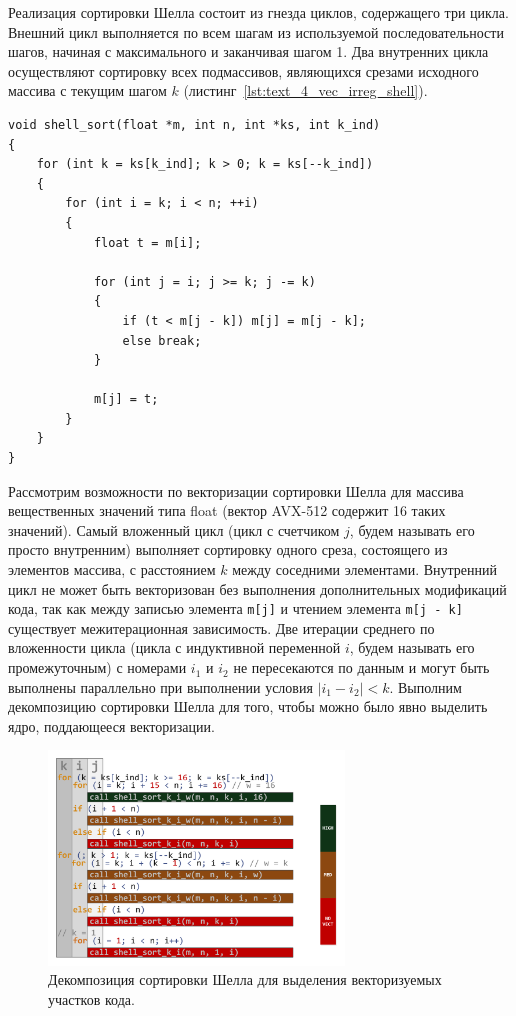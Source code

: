 Реализация сортировки Шелла состоит из гнезда циклов, содержащего три цикла.
Внешний цикл выполняется по всем шагам из используемой последовательности шагов, начиная с максимального и заканчивая шагом 1.
Два внутренних цикла осуществляют сортировку всех подмассивов, являющихся срезами исходного массива с текущим шагом $k$ (листинг~\ref{lst:text_4_vec_irreg_shell}).

\begin{lstlisting}[caption={Реализация сортировки Шелла.},label={lst:text_4_vec_irreg_shell}]
void shell_sort(float *m, int n, int *ks, int k_ind)
{
    for (int k = ks[k_ind]; k > 0; k = ks[--k_ind])
    {
        for (int i = k; i < n; ++i)
        {
            float t = m[i];

            for (int j = i; j >= k; j -= k)
            {
                if (t < m[j - k]) m[j] = m[j - k];
                else break;
            }

            m[j] = t;
        }
    }
}
\end{lstlisting}

Рассмотрим возможности по векторизации сортировки Шелла для массива вещественных значений типа float (вектор AVX-512\label{abbr:avx-12} содержит 16 таких значений).
Самый вложенный цикл (цикл с счетчиком $j$, будем называть его просто внутренним) выполняет сортировку одного среза, состоящего из элементов массива, с расстоянием $k$ между соседними элементами.
Внутренний цикл не может быть векторизован без выполнения дополнительных модификаций кода, так как между записью элемента \texttt{m[j]} и чтением элемента \texttt{m[j - k]} существует межитерационная зависимость.
Две итерации среднего по вложенности цикла (цикла с индуктивной переменной $i$, будем называть его промежуточным) с номерами $i_1$ и $i_2$ не пересекаются по данным и могут быть выполнены параллельно при выполнении условия $|i_1 - i_2| < k$.
Выполним декомпозицию сортировки Шелла для того, чтобы можно было явно выделить ядро, поддающееся векторизации.

\begin{figure}[ht]
\centering
\includegraphics[width=0.7\textwidth]{fig/vec_shell_code_decomp.pdf}
\singlespacing
{}\caption{Декомпозиция сортировки Шелла для выделения векторизуемых участков кода.}
\label{fig:text_4_vec_irreg_code_decomp}
\end{figure}

